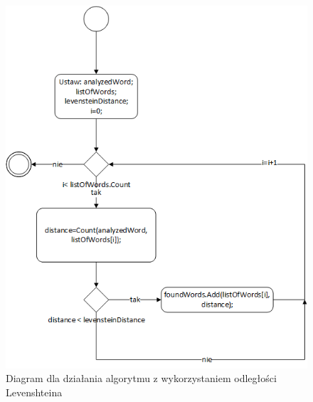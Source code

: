 \begin{figure} [H]
	\centering
	\includegraphics[width=0.6\linewidth]{rozdzial02/Levenstein1.png}
	\caption{Diagram dla działania algorytmu z wykorzystaniem odległości Levenshteina}
	\label{fig:Lev}
\end{figure}

